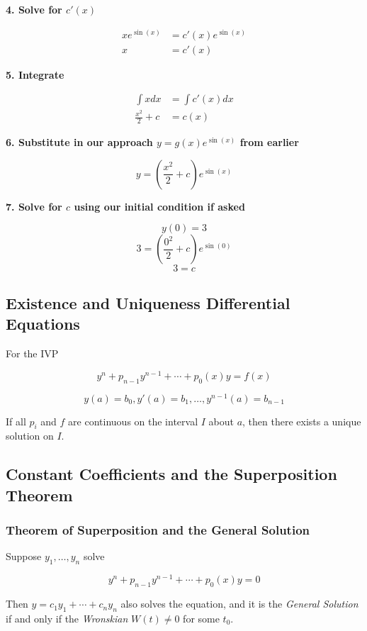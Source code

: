 \textbf{4. Solve for \(c'(x)\)}

\begin{align*}
    xe^{\sin(x)} &= c'(x)e^{\sin(x)}\\
    x &= c'(x)
\end{align*}

\textbf{5. Integrate}

\begin{align*}
    \int x dx &= \int c'(x)dx\\
    \frac{x^2}{2} + c &= c(x)
\end{align*}

\textbf{6. Substitute in our approach \(y = g(x)e^{\sin(x)}\) from earlier}

\[
    y = \left(\frac{x^2}{2} + c\right)e^{\sin(x)}
\]

\textbf{7. Solve for \(c\) using our initial condition if asked}

\[
    y(0) = 3
\]
\[
    3 = \left(\frac{0^2}{2} + c\right)e^{\sin(0)}
\]
\[
    3 = c
\]

\subsection{Existence and Uniqueness Differential Equations}

For the IVP

\[
    y^{n} + p_{n - 1}y^{n - 1}+ \cdots + p_0 (x)y = f(x)
\]

\[
    y(a) = b_0, y'(a) = b_1, \dots, y^{n - 1}(a) = b_{n - 1}
\]

If all \(p_i\) and \(f\) are continuous on the interval \(I\) about \(a\), then
there exists a unique solution on \(I\).

\subsection{Constant Coefficients and the Superposition Theorem}

\subsubsection{Theorem of Superposition and the General Solution}

Suppose \(y_1, \dots, y_n\) solve 

\[
    y^{n} + p_{n - 1}y^{n - 1}+ \cdots + p_0 (x)y = 0
\]

Then \(y = c_1 y_1 + \cdots + c_n y_n\) also solves the equation, and it is the 
\emph{General Solution} if and only if the \emph{Wronskian} \(W(t) \ne 0\) for some \(t_0\).


